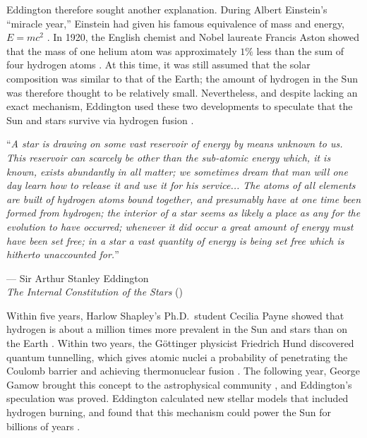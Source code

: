 Eddington therefore sought another explanation. 
During Albert Einstein's ``miracle year,'' Einstein had given his famous equivalence of mass and energy, ${E=mc^2}$ \citep{1905AnP...323..639E}. 
%
%
In 1920, the English chemist and Nobel laureate Francis Aston showed that the mass of one helium atom was approximately $1\%$ less than the sum of four hydrogen atoms \citep{aston1920lix}. 
At this time, it was still assumed that the solar composition was similar to that of the Earth; the amount of hydrogen in the Sun was therefore thought to be relatively small. 
Nevertheless, and despite lacking an exact mechanism, Eddington used these two developments to speculate that the Sun and stars survive via hydrogen fusion \citep{1920SciMo..11..297E}. 
\epigraph{``\emph{A star is drawing on some vast reservoir of energy by means unknown to us. \hphantom{``}This reservoir can scarcely be other than the sub-atomic energy which, it is \hphantom{``}known, exists abundantly in all matter; we sometimes dream that man will one \hphantom{``}day learn how to release it and use it for his service... The atoms of all elements \hphantom{``}are built of hydrogen atoms bound together, and presumably have at one time \hphantom{``}been formed from hydrogen; the interior of a star seems as likely a place as any for \hphantom{``}the evolution to have occurred; whenever it did occur a great amount of energy \hphantom{``}must have been set free; in a star a vast quantity of energy is being set free which \hphantom{``}is hitherto unaccounted for.}''}{--- Sir Arthur Stanley Eddington \\\emph{The Internal Constitution of the Stars} (\citeyear{1920SciMo..11..297E})} 

Within five years, Harlow Shapley's Ph.D.\ student Cecilia Payne showed that hydrogen is about a million times more prevalent in the Sun and stars than on the Earth \citep{1925PhDT.........1P}.
Within two years, the G\"ottinger physicist Friedrich Hund discovered quantum tunnelling, which gives atomic nuclei a probability of penetrating the Coulomb barrier and achieving thermonuclear fusion \citep{hund1927deutung,Nimtz2009}. 
The following year, George Gamow brought this concept to the astrophysical community \citep{1928Natur.122..805G}, and Eddington's speculation was proved. 
Eddington calculated new stellar models that included hydrogen burning, and found that this mechanism could power the Sun for billions of years \citep{1926ics..book.....E}. 

